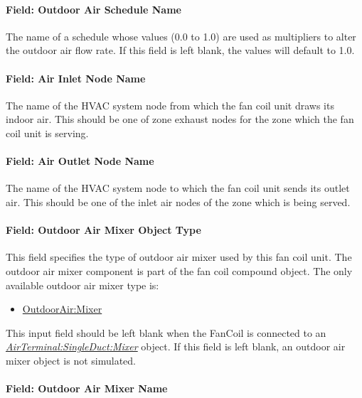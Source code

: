 \paragraph{Field: Outdoor Air Schedule Name}\label{field-outdoor-air-schedule-name-000}

The name of a schedule whose values (0.0 to 1.0) are used as multipliers to alter the outdoor air flow rate. If this field is left blank, the values will default to 1.0.

\paragraph{Field: Air Inlet Node Name}\label{field-air-inlet-node-name-009}

The name of the HVAC system node from which the fan coil unit draws its indoor air. This should be one of zone exhaust nodes for the zone which the fan coil unit is serving.

\paragraph{Field: Air Outlet Node Name}\label{field-air-outlet-node-name-008}

The name of the HVAC system node to which the fan coil unit sends its outlet air. This should be one of the inlet air nodes of the zone which is being served.

\paragraph{Field: Outdoor Air Mixer Object Type}\label{field-outdoor-air-mixer-object-type-000}

This field specifies the type of outdoor air mixer used by this fan coil unit. The outdoor air mixer component is part of the fan coil compound object. The only available outdoor air mixer type is:

\begin{itemize}
\tightlist
\item
  \hyperref[outdoorairmixer]{OutdoorAir:Mixer}
\end{itemize}

This input field should be left blank when the FanCoil is connected to an \textit{\hyperref[airterminalsingleductmixer]{AirTerminal:SingleDuct:Mixer}} object. If this field is left blank, an outdoor air mixer object is not simulated.

\paragraph{Field: Outdoor Air Mixer Name}\label{field-outdoor-air-mixer-name-000}

